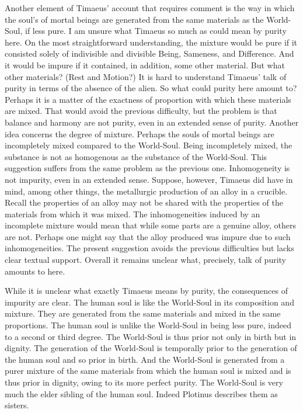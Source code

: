 Another element of Timaeus' account that requires comment is the way in which the soul's of mortal beings are generated from the same materials as the World-Soul, if less pure. I am unsure what Timaeus so much as could mean by purity here. On the most straightforward understanding, the mixture would be pure if it consisted solely of indivisible and divisible Being, Sameness, and Difference. And it would be impure if it contained, in addition, some other material. But what other materials? (Rest and Motion?) It is hard to understand Timaeus' talk of purity in terms of the absence of the alien. So what could purity here amount to? Perhaps it is a matter of the exactness of proportion with which these materials are mixed. That would avoid the previous difficulty, but the problem is that balance and harmony are not purity, even in an extended sense of purity. Another idea concerns the degree of mixture. Perhaps the souls of mortal beings are incompletely mixed compared to the World-Soul. Being incompletely mixed, the substance is not as homogenous as the substance of the World-Soul. This suggestion suffers from the same problem as the previous one. Inhomogeneity is not impurity, even in an extended sense. Suppose, however, Timaeus did have in mind, among other things, the metallurgic production of an alloy in a crucible. Recall the properties of an alloy may not be shared with the properties of the materials from which it was mixed. The inhomogeneities induced by an incomplete mixture would mean that while some parts are a genuine alloy, others are not. Perhaps one might say that the alloy produced was impure due to such inhomogeneities. The present suggestion avoids the previous difficulties but lacks clear textual support. Overall it remains unclear what, precisely, talk of purity amounts to here.

While it is unclear what exactly Timaeus means by purity, the consequences of impurity are clear. The human soul is like the World-Soul in its composition and mixture. They are generated from the same materials and mixed in the same proportions. The human soul is unlike the World-Soul in being less pure, indeed to a second or third degree. The World-Soul is thus prior not only in birth but in dignity. The generation of the World-Soul is temporally prior to the generation of the human soul and so prior in birth. And the World-Soul is generated from a purer mixture of the same materials from which the human soul is mixed and is thus prior in dignity, owing to its more perfect purity. The World-Soul is very much the elder sibling of the human soul. Indeed Plotinus describes them as sisters.

